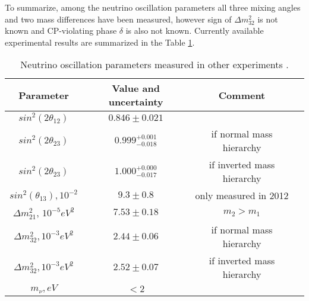 To summarize, among the neutrino oscillation parameters all three mixing angles and two mass differences have been measured, however sign of ${\Delta}m^2_{32}$ is not known and CP-violating phase $\delta$ is also not known. Currently available experimental results are summarized in the Table \ref{tab:MeasuredPars}.\\
\begin{table}[h]
  \begin{center}
  \caption{ Neutrino oscillation parameters measured in other experiments \cite{ref_PDG}.}
  \begin{tabular}{|c|c|c|c|}
     Parameter & Value and uncertainty & Comment \\ \hline
     $sin^2(2\theta_{12})$ &  $0.846\pm0.021$ & \\ \hline 
     $sin^2(2\theta_{23})$ &  $0.999^{+0.001}_{-0.018}$ & if normal mass hierarchy \\ \hline 
     $sin^2(2\theta_{23})$ &  $1.000^{+0.000}_{-0.017}$  & if inverted mass hierarchy \\ \hline 
     $sin^2(\theta_{13}), 10^{-2}$ &  $9.3\pm0.8$  & only measured in 2012\\ \hline 
     ${\Delta}m^2_{21}$, $10^{-5} eV^2$ &  $7.53\pm0.18$  &  $m_{2}>m_{1}$   \\ \hline 
     ${\Delta}m^2_{32}, 10^{-3} eV^2$ &  $2.44\pm0.06$  &  if normal mass hierarchy     \\ \hline
     ${\Delta}m^2_{32}, 10^{-3} eV^2$ &  $2.52\pm0.07$  &  if inverted mass hierarchy     \\
     $m_\nu, eV$ &  $<2$  &      \\ \hline 
  \end{tabular}
  \label{tab:MeasuredPars}
  \end{center}
\end{table}


